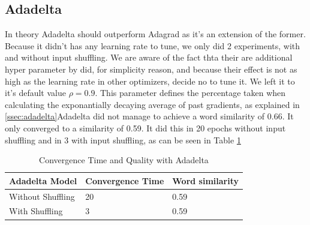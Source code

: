 \subsection{Adadelta}
In theory Adadelta \cite{adadelta} should outperform Adagrad as it's an extension of the former. Because it didn't has any learning rate to tune, we only did 2 experiments, with and without input shuffling. We are aware of the fact thta their are additional hyper parameter by did, for simplicity reason, and because their effect is not as high as the learning rate in other optimizers, decide no to tune it. We left it to it's default value $\rho = 0.9$. This parameter defines the percentage taken when calculating the exponantially decaying average of past gradients, as explained in \ref{ssec:adadelta}Adadelta did not manage to achieve a word similarity of 0.66. It only converged to a similarity of 0.59. It did this in 20 epochs without input shuffling and in 3 with input shuffling, as can be seen in Table \ref{table:results_adadelta}
\begin{table}[h]
\centering
\begin{tabular}{|l|l|l|}
\hline
Adadelta Model    & Convergence Time & Word similarity \\ \hline
Without Shuffling & 20               & 0.59            \\ \hline
With Shuffling    & 3                & 0.59            \\ \hline
\end{tabular}
\caption{Convergence Time and Quality with Adadelta}
\label{table:results_adadelta}
\end{table}

